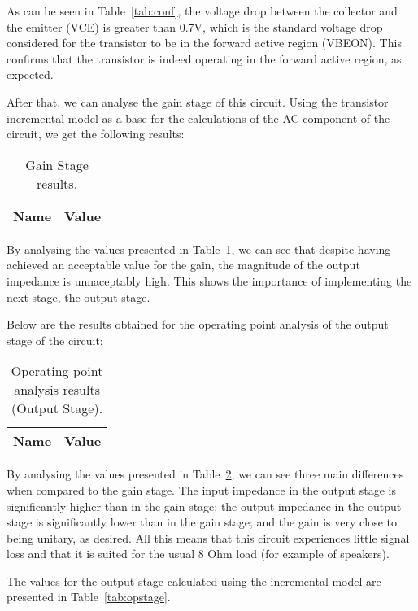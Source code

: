 As can be seen in Table~\ref{tab:conf}, the voltage drop between the collector and the emitter (VCE) is greater than 0.7V, which is the standard voltage drop considered for the transistor to be in the forward active region (VBEON). This confirms that the transistor is indeed operating in the forward active region, as expected.

After that, we can analyse the gain stage of this circuit. Using the transistor incremental model as a base for the calculations of the AC component of the circuit, we get the following results:

\begin{table}[h]
  \centering
  \begin{tabular}{|l|r|}
    \hline    
    {\bf Name} & {\bf Value} \\ \hline
    
  \end{tabular}
  \caption{Gain Stage results.}
  \label{tab:gain}
\end{table}


By analysing the values presented in Table~\ref{tab:gain}, we can see that despite having achieved an acceptable value for the gain, the magnitude of the output impedance is unnaceptably high. This shows the importance of implementing the next stage, the output stage.


Below are the results obtained for the operating point analysis of the output stage of the circuit:

\begin{table}[h]
  \centering
  \begin{tabular}{|l|r|}
    \hline    
    {\bf Name} & {\bf Value} \\ \hline
    
  \end{tabular}
	\caption{Operating point analysis results (Output Stage).}
  \label{tab:opout}
\end{table}

By analysing the values presented in Table~\ref{tab:opout}, we can see three main differences when compared to the gain stage. The input impedance in the output stage is significantly higher than in the gain stage; the output impedance in the output stage is significantly lower than in the gain stage; and the gain is very close to being unitary, as desired. All this means that this circuit experiences little signal loss and that it is suited for the usual 8 Ohm load (for example of speakers).

The values for the output stage calculated using the incremental model are presented in Table~\ref{tab:opstage}.

